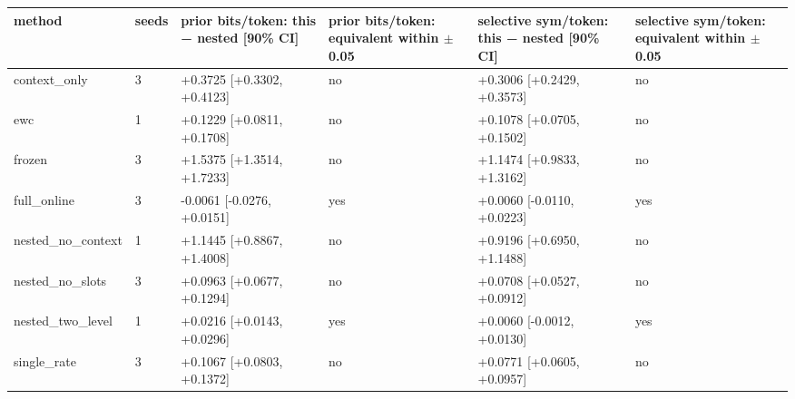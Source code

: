 \begin{tabular}{llllll}
\hline
method & seeds & prior bits/token: this − nested [90\% CI] & prior bits/token: equivalent within $\pm$0.05 & selective sym/token: this − nested [90\% CI] & selective sym/token: equivalent within $\pm$0.05 \\
\hline
context\_only & 3 & +0.3725 [+0.3302, +0.4123] & no & +0.3006 [+0.2429, +0.3573] & no \\
ewc & 1 & +0.1229 [+0.0811, +0.1708] & no & +0.1078 [+0.0705, +0.1502] & no \\
frozen & 3 & +1.5375 [+1.3514, +1.7233] & no & +1.1474 [+0.9833, +1.3162] & no \\
full\_online & 3 & -0.0061 [-0.0276, +0.0151] & yes & +0.0060 [-0.0110, +0.0223] & yes \\
nested\_no\_context & 1 & +1.1445 [+0.8867, +1.4008] & no & +0.9196 [+0.6950, +1.1488] & no \\
nested\_no\_slots & 3 & +0.0963 [+0.0677, +0.1294] & no & +0.0708 [+0.0527, +0.0912] & no \\
nested\_two\_level & 1 & +0.0216 [+0.0143, +0.0296] & yes & +0.0060 [-0.0012, +0.0130] & yes \\
single\_rate & 3 & +0.1067 [+0.0803, +0.1372] & no & +0.0771 [+0.0605, +0.0957] & no \\
\hline
\end{tabular}
